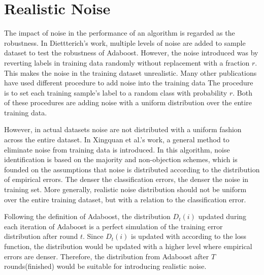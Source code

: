 \section{Realistic Noise}
The impact of noise in the performance of an algorithm is regarded as the robustness.
In Diettterich’s work\cite{dietterich2000experimental}, multiple levels of noise are added to sample dataset to test the robustness of Adaboost.
However, the noise introduced was by reverting labels in training data randomly without replacement with a fraction $r$.
This makes the noise in the training dataset unrealistic.
Many other publications have used different procedure to add noise into the training data
The procedure is to set each training sample’s label to a random class with probability $r$.
Both of these procedures are adding noise with a uniform distribution over the entire training data.

However, in actual datasets noise are not distributed with a uniform fashion across the entire dataset.
In Xingquan et al.’s work\cite{zhu2003eliminating}, a general method to eliminate noise from training data is introduced.
In this algorithm, noise identification is based on the majority and non-objection schemes,
which is founded on the assumptions that noise is distributed according to the distribution of empirical errors.
The denser the classification errors, the denser the noise in training set.
More generally, realistic noise distribution should not be uniform over the entire training dataset, but with a relation to the classification error.

Following the definition of Adaboost, the distribution $D_t(i)$ updated during each iteration of Adaboost is a perfect simulation of the training error distribution after round $t$.
Since $D_t(i)$ is updated with according to the loss function, the distribution would be updated with a higher level where empirical errors are denser.
Therefore, the distribution from Adaboost after $T$ rounds(finished) would be suitable for introducing realistic noise.
